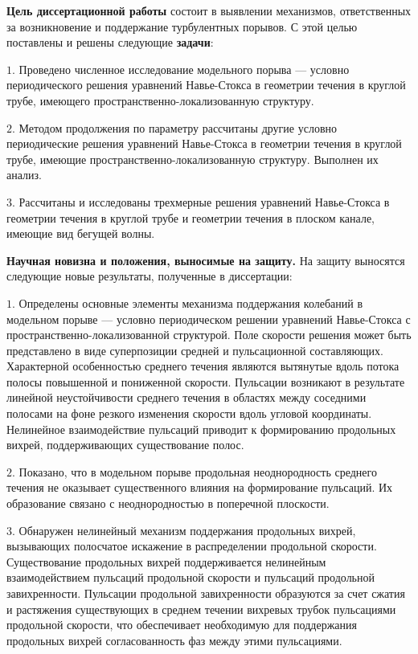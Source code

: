{\bf Цель диссертационной работы} состоит в выявлении механизмов, ответственных за возникновение и поддержание турбулентных порывов. 
С этой целью поставлены и решены следующие \textbf{задачи}: 

\noindent $1.$ Проведено численное исследование модельного порыва --- условно периодического решения уравнений Навье-Стокса в геометрии течения в круглой трубе, имеющего пространственно-локализованную структуру. %

\noindent $2.$ Методом продолжения по параметру рассчитаны другие условно периодические решения уравнений Навье-Стокса в геометрии течения в круглой трубе, имеющие пространственно-локализованную структуру. Выполнен их анализ. %

\noindent $3.$ Рассчитаны и исследованы трехмерные решения уравнений Навье-Стокса в геометрии течения в круглой трубе и геометрии течения в плоском канале, имеющие вид бегущей волны. %


{\bf Научная новизна и положения, выносимые на защиту.} На защиту выносятся следующие новые результаты, полученные в диссертации:

\noindent $1.$ Определены основные элементы механизма поддержания колебаний в модельном порыве --- условно периодическом решении уравнений Навье-Стокса с пространственно-локализованной структурой. Поле скорости решения может быть представлено в виде суперпозиции средней и пульсационной составляющих. Характерной особенностью среднего течения являются вытянутые вдоль потока полосы повышенной и пониженной скорости. Пульсации возникают в результате линейной неустойчивости среднего течения в областях между соседними полосами на фоне резкого изменения скорости вдоль угловой координаты. Нелинейное взаимодействие пульсаций приводит к формированию продольных вихрей, поддерживающих существование полос.

\noindent $2.$ Показано, что в модельном порыве продольная неоднородность среднего течения не оказывает существенного влияния на формирование пульсаций. Их образование связано с неоднородностью в поперечной плоскости.

\noindent $3.$ Обнаружен нелинейный механизм поддержания продольных вихрей, вызывающих полосчатое искажение в распределении продольной скорости. Существование продольных вихрей поддерживается нелинейным взаимодействием пульсаций продольной скорости и пульсаций продольной завихренности. Пульсации продольной завихренности образуются за счет сжатия и растяжения существующих в среднем течении вихревых трубок пульсациями продольной скорости, что обеспечивает необходимую для поддержания продольных вихрей согласованность фаз между этими пульсациями. 

